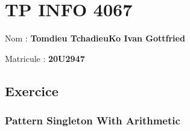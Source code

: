\hypertarget{tp-info-4067}{%
\section{TP INFO 4067}\label{tp-info-4067}}

Nom : \textbf{Tomdieu TchadieuKo Ivan Gottfried}

Matricule : \textbf{20U2947}

\hypertarget{exercice}{%
\subsection{Exercice}\label{exercice}}

\hypertarget{pattern-singleton-with-arithmetic}{%
\subsubsection{Pattern Singleton With
Arithmetic}\label{pattern-singleton-with-arithmetic}}

